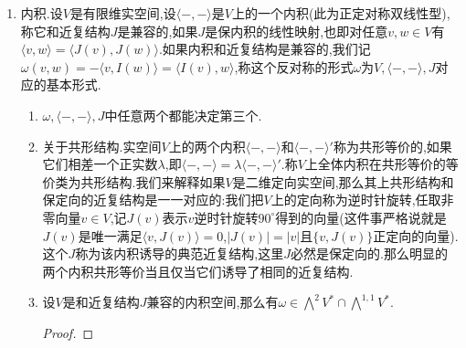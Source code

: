 \begin{enumerate}
\begin{enumerate}[(1)]
\begin{proof}
        	这件事就是因为$\overline{w_1\wedge w_2}=\overline{w_1}\wedge\overline{w_2}$以及取共轭诱导了$V^{1,0}\cong V^{0,1}$.
        \end{proof}
        \item 我们有外积同态$\bigwedge^{p,q}V\times\bigwedge^{r,s}V\to\bigwedge^{p+r,q+s}V$为$(\alpha,\beta)\mapsto\alpha\wedge\beta$.
        \item 关于基.我们知道$V_{\mathbb{C}}$中的向量可以表示为$x+yi$其中$x,y\in V$,于是可设$\{z_k=\frac{1}{2}(x_k-iy_k)\mid1\le k\le n\}$构成了$V^{1,0}$的一组基,其中$x_k,y_k\in V$.按照$J(z_k)=iz_k$,于是有$y_k=J(x_k)$和$x_k=-J(y_k)$.进而$\{x_k,y_k\mid1\le k\le n\}$构成了$V$的一组基,并且$V^{0,1}$的一组基可以表示为$\{\overline{z_k}=\frac{1}{2}(x_k+iy_k)\}$.反过来如果$\{x_k,y_k=J(x_k)\mid1\le k\le n\}$构成$V$的一组实基,那么$\{z_k=\frac{1}{2}(x_k-iy_k)\mid1\le k\le n\}$构成$V^{1,0}$的一组复基,$\{\overline{z_k}=\frac{1}{2}(x_k+iy_k)\mid1\le k\le n\}$构成$V^{0,1}$的一组复基.
        \item 如果记$n=\dim_{\mathbb{C}}V^{1,0}$,做上一条相同的记号,那么有如下等式,并且这定义了实空间$V$上的典范体积形式.
        $$(-2i)^n(z_1\wedge\overline{z_1})\wedge\cdots\wedge(z_n\wedge\overline{z_n})=(x_1\wedge y_1)\wedge\cdots\wedge(x_n\wedge y_n)$$
        \item 关于对偶.我们有典范同构$\bigwedge^kV^*\cong\left(\bigwedge^kV\right)^*$为:
        $$(\alpha_1\wedge\cdots\wedge\alpha_k)(v_1\wedge\cdots\wedge v_k)=\det\left(\alpha_j(v_i)\right)_{i,j}$$
    \end{enumerate}
    \item 内积.设$V$是有限维实空间,设$\langle-,-\rangle$是$V$上的一个内积(此为正定对称双线性型),称它和近复结构$J$是兼容的,如果$J$是保内积的线性映射,也即对任意$v,w\in V$有$\langle v,w\rangle=\langle J(v),J(w)\rangle$.如果内积和近复结构是兼容的,我们记$\omega(v,w)=-\langle v,I(w)\rangle=\langle I(v),w\rangle$,称这个反对称的形式$\omega$为$V,\langle-,-\rangle,J$对应的基本形式.
    \begin{enumerate}[(1)]
    	\item $\omega,\langle-,-\rangle,J$中任意两个都能决定第三个.
    	\item 关于共形结构.实空间$V$上的两个内积$\langle-,-\rangle$和$\langle-,-\rangle'$称为共形等价的,如果它们相差一个正实数$\lambda$,即$\langle-,-\rangle=\lambda\langle-,-\rangle'$.称$V$上全体内积在共形等价的等价类为共形结构.我们来解释如果$V$是二维定向实空间,那么其上共形结构和保定向的近复结构是一一对应的:我们把$V$上的定向称为逆时针旋转,任取非零向量$v\in V$,记$J(v)$表示$v$逆时针旋转$90^{\circ}$得到的向量(这件事严格说就是$J(v)$是唯一满足$\langle v,J(v)\rangle=0$,$|J(v)|=|v|$且$\{v,J(v)\}$正定向的向量).这个$J$称为该内积诱导的典范近复结构,这里$J$必然是保定向的.那么明显的两个内积共形等价当且仅当它们诱导了相同的近复结构.
    	\item 设$V$是和近复结构$J$兼容的内积空间,那么有$\omega\in\bigwedge^2V^*\cap\bigwedge^{1,1}V^*$.
    	\begin{proof}
    		

\end{proof}
\end{enumerate}
\end{enumerate}
